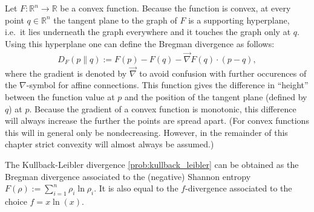     \begin{definition}\label{info:bregman_divergence}
        Let $F:\mathbb{R}^n\rightarrow\mathbb{R}$ be a convex function. Because the function is convex, at every point $q\in\mathbb{R}^n$ the tangent plane to the graph of $F$ is a supporting hyperplane, i.e.~it lies underneath the graph everywhere and it touches the graph only at $q$. Using this hyperplane one can define the Bregman divergence as follows:
        \begin{gather}
            D_F(p\|q) := F(p) - F(q) - \vec{\nabla}F(q)\cdot(p-q),
        \end{gather}
        where the gradient is denoted by $\vec{\nabla}$ to avoid confusion with further occurences of the $\nabla$-symbol for affine connections. This function gives the difference in ``height'' between the function value at $p$ and the position of the tangent plane (defined by $q$) at $p$. Because the gradient of a convex function is monotonic, this difference will always increase the further the points are spread apart. (For convex functions this will in general only be nondecreasing. However, in the remainder of this chapter strict convexity will almost always be assumed.)
    \end{definition}
    \begin{example}
        The Kullback-Leibler divergence \ref{prob:kullback_leibler} can be obtained as the Bregman divergence associated to the (negative) Shannon entropy $F(\rho) := \sum_{i=1}^n\rho_i\ln\rho_i$. It is also equal to the $f$-divergence associated to the choice $f=x\ln(x)$.
    \end{example}

